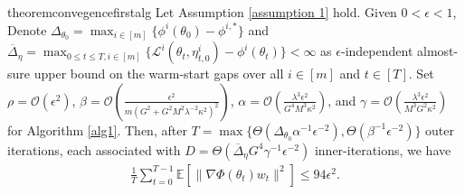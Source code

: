 \documentclass[twoside]{article} %
\theoremstyle{plain}
\theoremstyle{definition}
\theoremstyle{remark}
\newcommand{\fL}{\mathcal{L}}
\begin{document}
\begin{restatable}{theorem}{convegencefirstalg}\label{restatethm: convergence of algorithm 1}
    Let Assumption \ref{assumption 1} hold. Given $0<\epsilon<1$, Denote $\Delta_{\theta_0} = \max_{i\in[m]}\{\phi^i(\theta_0)-\phi^{i,*}\}$ and 
    $\overline{\Delta}_{\eta}= \max_{0\leq t\leq T, i\in[m]}\big \{\fL^i({\theta}_t,\eta^i_{t,0})-\phi^i({\theta_t})\}<\infty$ as $\epsilon$-independent almost-sure upper bound on the warm-start gaps over all $i\in[m]$ and $t\in [T]$.
    Set $\rho=\mathcal{O}(\epsilon^2)$, $\beta=\mathcal{O}(\frac{\epsilon^2}{m(G^2+G^2M^2\lambda^{-2}\kappa^2)^2})$,
    $\alpha = \mathcal{O}(\frac{\lambda^{3}\epsilon^2}{G^4M^3\kappa^2})$, and $\gamma = \mathcal{O}(\frac{\lambda^3\epsilon^2}{M^3G^2\kappa^2})$ for Algorithm \ref{alg1}. Then, after $T=\max\big\{\Theta(\Delta_{\theta_0}\alpha^{-1}\epsilon^{-2}), \Theta(\beta^{-1}\epsilon^{-2})\big\}$ outer iterations, each associated with $D=\Theta(\overline{\Delta}_{\eta}G^4\gamma^{-1}\epsilon^{-2})$ inner-iterations, we have 
    \begin{align}
        \frac{1}{T}\sum_{t=0}^{T-1}\mathbb{E}[\|\nabla \Phi(\theta_t)w_t\|^2]\leq 94\epsilon^2.
    \end{align}
\end{restatable}
\end{document}
